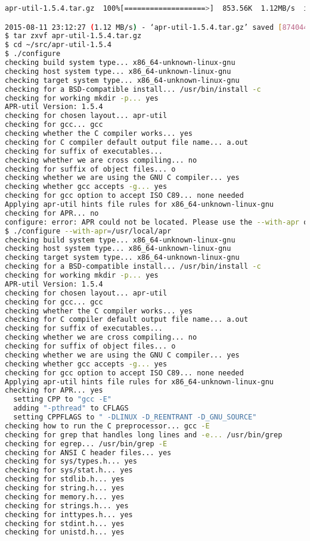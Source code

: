 \begin{lstlisting}[language=bash]
apr-util-1.5.4.tar.gz  100%[===================>]  853.56K  1.12MB/s  in 0.7s   

2015-08-11 23:12:27 (1.12 MB/s) - ‘apr-util-1.5.4.tar.gz’ saved [874044/874044]
$ tar zxvf apr-util-1.5.4.tar.gz
$ cd ~/src/apr-util-1.5.4
$ ./configure
checking build system type... x86_64-unknown-linux-gnu
checking host system type... x86_64-unknown-linux-gnu
checking target system type... x86_64-unknown-linux-gnu
checking for a BSD-compatible install... /usr/bin/install -c
checking for working mkdir -p... yes
APR-util Version: 1.5.4
checking for chosen layout... apr-util
checking for gcc... gcc
checking whether the C compiler works... yes
checking for C compiler default output file name... a.out
checking for suffix of executables... 
checking whether we are cross compiling... no
checking for suffix of object files... o
checking whether we are using the GNU C compiler... yes
checking whether gcc accepts -g... yes
checking for gcc option to accept ISO C89... none needed
Applying apr-util hints file rules for x86_64-unknown-linux-gnu
checking for APR... no
configure: error: APR could not be located. Please use the --with-apr option.
$ ./configure --with-apr=/usr/local/apr
checking build system type... x86_64-unknown-linux-gnu
checking host system type... x86_64-unknown-linux-gnu
checking target system type... x86_64-unknown-linux-gnu
checking for a BSD-compatible install... /usr/bin/install -c
checking for working mkdir -p... yes
APR-util Version: 1.5.4
checking for chosen layout... apr-util
checking for gcc... gcc
checking whether the C compiler works... yes
checking for C compiler default output file name... a.out
checking for suffix of executables... 
checking whether we are cross compiling... no
checking for suffix of object files... o
checking whether we are using the GNU C compiler... yes
checking whether gcc accepts -g... yes
checking for gcc option to accept ISO C89... none needed
Applying apr-util hints file rules for x86_64-unknown-linux-gnu
checking for APR... yes
  setting CPP to "gcc -E"
  adding "-pthread" to CFLAGS
  setting CPPFLAGS to " -DLINUX -D_REENTRANT -D_GNU_SOURCE"
checking how to run the C preprocessor... gcc -E
checking for grep that handles long lines and -e... /usr/bin/grep
checking for egrep... /usr/bin/grep -E
checking for ANSI C header files... yes
checking for sys/types.h... yes
checking for sys/stat.h... yes
checking for stdlib.h... yes
checking for string.h... yes
checking for memory.h... yes
checking for strings.h... yes
checking for inttypes.h... yes
checking for stdint.h... yes
checking for unistd.h... yes

\end{lstlisting}
